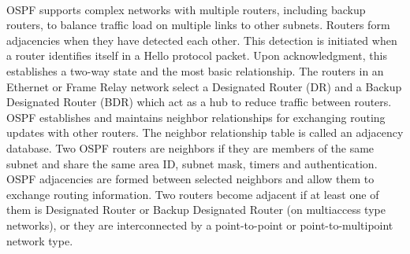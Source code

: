 \paragraph{}OSPF supports complex networks with multiple routers, including backup routers, to balance traffic load on multiple links to other subnets. Routers form adjacencies when they have detected each other. This detection is initiated when a router identifies itself in a Hello protocol packet. Upon acknowledgment, this establishes a two-way state and the most basic relationship. The routers in an Ethernet or Frame Relay network select a Designated Router (DR) and a Backup Designated Router (BDR) which act as a hub to reduce traffic between routers. OSPF establishes and maintains neighbor relationships for exchanging routing updates with other routers. The neighbor relationship table is called an adjacency database. Two OSPF routers are neighbors if they are members of the same subnet and share the same area ID, subnet mask, timers and authentication. OSPF adjacencies are formed between selected neighbors and allow them to exchange routing information. Two routers become adjacent if at least one of them is Designated Router or Backup Designated Router (on multiaccess type networks), or they are interconnected by a point-to-point or point-to-multipoint network type.
